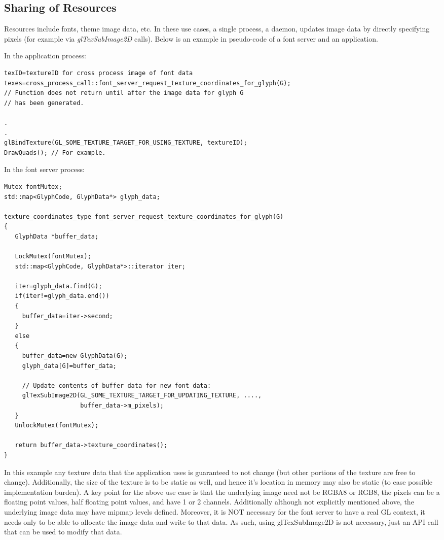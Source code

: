 \documentclass[a4paper,11pt]{article}
\begin{document}
\subsection{Sharing of Resources}
\begin{indenter}{2cm}

Resources include fonts, theme image data, etc. In these use cases, a single process, a daemon, updates image data by directly specifying pixels (for example via \textit{glTexSubImage2D} calls). Below is an example in pseudo-code of a font server and an application.

In the application process:
\begin{verbatim}
texID=textureID for cross process image of font data
texes=cross_process_call::font_server_request_texture_coordinates_for_glyph(G);
// Function does not return until after the image data for glyph G
// has been generated.

.
.
glBindTexture(GL_SOME_TEXTURE_TARGET_FOR_USING_TEXTURE, textureID);
DrawQuads(); // For example.
\end{verbatim}

In the font server process:
\begin{verbatim}
Mutex fontMutex;
std::map<GlyphCode, GlyphData*> glyph_data;

texture_coordinates_type font_server_request_texture_coordinates_for_glyph(G)
{
   GlyphData *buffer_data;

   LockMutex(fontMutex);
   std::map<GlyphCode, GlyphData*>::iterator iter;
            
   iter=glyph_data.find(G);
   if(iter!=glyph_data.end())
   {
     buffer_data=iter->second; 
   }
   else
   {  
     buffer_data=new GlyphData(G);
     glyph_data[G]=buffer_data;
     
     // Update contents of buffer data for new font data:
     glTexSubImage2D(GL_SOME_TEXTURE_TARGET_FOR_UPDATING_TEXTURE, ...., 
                     buffer_data->m_pixels);
   }
   UnlockMutex(fontMutex);

   return buffer_data->texture_coordinates();
}
\end{verbatim}

In this example any texture data that the application uses is guaranteed to not change (but other portions of the texture are free to change). Additionally, the size of the texture is to be static as well, and hence it's location in memory may also be static (to ease possible implementation burden). A key point for the above use case is that the underlying image need not be RGBA8 or RGB8, the pixels can be a floating point values, half floating point values, and have 1 or 2 channels. Additionally although not explicitly mentioned above, the underlying image data may have mipmap levels defined. Moreover, it is NOT necessary for the font server to have a real GL context, it needs only to be able to allocate the image data and write to that data. As such, using glTexSubImage2D is not necessary, just an API call that can be used to modify that data. 

\end{indenter}
\end{document}

